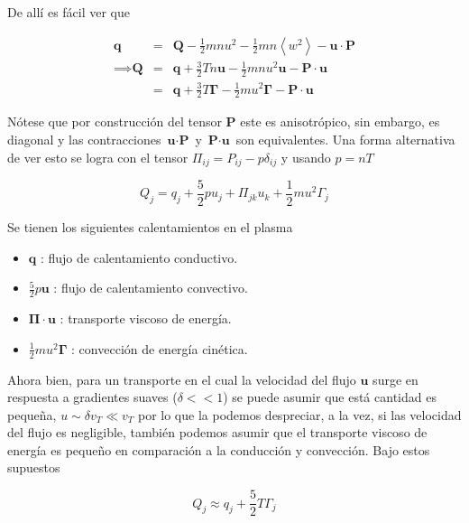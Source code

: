 \documentclass[11pt]{article}
\theoremstyle{definition}
\begin{document}
  De all\'i es f\'acil ver que 

  \begin{eqnarray}
    \textbf{q} &=& \textbf{Q} -\frac{1}{2}mnu^2 - \frac{1}{2}mn\left<w^2\right> - \textbf{u}\cdot\textbf{P}\nonumber\\
    \implies \textbf{Q} &=& \textbf{q} + \frac{3}{2}Tn\textbf{u} - \frac{1}{2}mnu^2\textbf{u} - \textbf{P}\cdot\textbf{u}\nonumber \\
                        &=& \textbf{q} + \frac{3}{2}T\pmb{\Gamma} - \frac{1}{2}mu^2\pmb{\Gamma} - \textbf{P}\cdot\textbf{u}
  \end{eqnarray}

  N\'otese que por construcci\'on del tensor $\textbf{P}$ este es anisotr\'opico, sin embargo, es diagonal y las contracciones $\textbf{u}\cdot\textbf{P}$ y $\textbf{P}\cdot\textbf{u}$ son equivalentes. Una forma alternativa de ver esto se logra con el tensor $\Pi_{ij} = P_{ij} - p\delta_{ij}$ y usando $p = nT$ 

  \begin{equation}
    Q_j = q_j + \frac{5}{2}pu_j + \Pi_{jk}u_k + \frac{1}{2}mu^2\Gamma_j
  \end{equation}

  Se tienen los siguientes calentamientos en el plasma\cite{helander2005}

  \begin{itemize}
    \item $\textbf{q}$ : flujo de calentamiento conductivo.
    \item $\frac{5}{2}p\textbf{u}$ : flujo de calentamiento convectivo.
    \item $\pmb{\Pi}\cdot\textbf{u}$ : transporte viscoso de energ\'ia.
    \item $\frac{1}{2}mu^2\pmb{\Gamma}$ : convecci\'on de energ\'ia cin\'etica.
  \end{itemize}

Ahora bien, para un transporte en el cual la velocidad del flujo $\textbf{u}$ surge en respuesta a gradientes suaves ($\delta << 1$) se puede asumir que est\'a cantidad es pequeña, $u \sim \delta v_T \ll v_T$ por lo que la podemos despreciar, a la vez, si las velocidad del flujo es negligible, tambi\'en podemos asumir que el transporte viscoso de energ\'ia es pequeño en comparaci\'on a la conducci\'on y convecci\'on. Bajo estos supuestos\cite{dinklage2005}

  \begin{equation*}
    Q_j \approx q_j + \frac{5}{2}T\Gamma_j
  \end{equation*}
\end{document}
